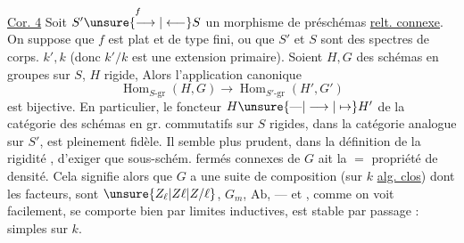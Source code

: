 \uline{Cor. 4} Soit $S'\overset{f}{\unsure{\longrightarrow|\longleftarrow}}S$ un morphisme de
préschémas \uline{relt. connexe}. On suppose que
\margin{\rule[-6\baselineskip]{0.35pt}{6\baselineskip}}$f$ est  plat et de type fini, ou que
$S'$ et $S$ sont des spectres de corps. 
 $k',k$ (donc $k'/k$ est une extension
primaire).  Soient
 $H,G$ des schémas en
groupes   sur $S$, $H$  rigide,
Alors l'application canonique
\[
\operatorname{Hom}_{S\text{-}\mathrm{gr}}(H,G)\longrightarrow\operatorname{Hom}_{S'\text{-}\mathrm{gr}}(H',G')
\]
est bijective. En particulier, le
foncteur $H\unsure{\text{---}|\longrightarrow|\mapsto}H'$ de la catégorie
\margin{\rule[-3\baselineskip]{0.35pt}{3\baselineskip}}des schémas en gr. commutatifs 
sur $S$  rigides, dans la catégorie
analogue sur $S'$, est pleinement fidèle.
Il semble plus prudent, dans la définition de
la rigidité , d'exiger que  sous-schém. fermés  connexes
de $G$ ait la $=$ propriété de densité. Cela
signifie alors que $G$ a une suite de
composition (sur $k$ \uline{alg. clos})  dont les facteurs,
sont $\unsure{Z_{\ell}|Z\ell|Z/\ell}$, $G_m$, $\mathrm{Ab}$, --- et   
, comme on voit facilement, se comporte
bien par limites inductives, est stable
par passage :    simples
sur $k$.



